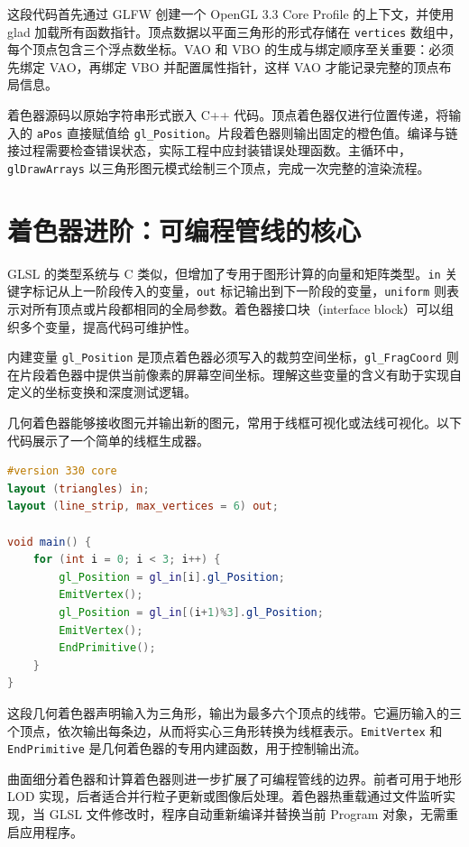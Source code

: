 这段代码首先通过 GLFW 创建一个 OpenGL 3.3 Core Profile 的上下文，并使用 glad 加载所有函数指针。顶点数据以平面三角形的形式存储在 \texttt{vertices} 数组中，每个顶点包含三个浮点数坐标。VAO 和 VBO 的生成与绑定顺序至关重要：必须先绑定 VAO，再绑定 VBO 并配置属性指针，这样 VAO 才能记录完整的顶点布局信息。\par
着色器源码以原始字符串形式嵌入 C++ 代码。顶点着色器仅进行位置传递，将输入的 \texttt{aPos} 直接赋值给 \texttt{gl\_{}Position}。片段着色器则输出固定的橙色值。编译与链接过程需要检查错误状态，实际工程中应封装错误处理函数。主循环中，\texttt{glDrawArrays} 以三角形图元模式绘制三个顶点，完成一次完整的渲染流程。\par
\chapter{着色器进阶：可编程管线的核心}
GLSL 的类型系统与 C 类似，但增加了专用于图形计算的向量和矩阵类型。\texttt{in} 关键字标记从上一阶段传入的变量，\texttt{out} 标记输出到下一阶段的变量，\texttt{uniform} 则表示对所有顶点或片段都相同的全局参数。着色器接口块（interface block）可以组织多个变量，提高代码可维护性。\par
内建变量 \texttt{gl\_{}Position} 是顶点着色器必须写入的裁剪空间坐标，\texttt{gl\_{}FragCoord} 则在片段着色器中提供当前像素的屏幕空间坐标。理解这些变量的含义有助于实现自定义的坐标变换和深度测试逻辑。\par
几何着色器能够接收图元并输出新的图元，常用于线框可视化或法线可视化。以下代码展示了一个简单的线框生成器。\par
\begin{lstlisting}[language=glsl]
#version 330 core
layout (triangles) in;
layout (line_strip, max_vertices = 6) out;

void main() {
    for (int i = 0; i < 3; i++) {
        gl_Position = gl_in[i].gl_Position;
        EmitVertex();
        gl_Position = gl_in[(i+1)%3].gl_Position;
        EmitVertex();
        EndPrimitive();
    }
}
\end{lstlisting}
这段几何着色器声明输入为三角形，输出为最多六个顶点的线带。它遍历输入的三个顶点，依次输出每条边，从而将实心三角形转换为线框表示。\texttt{EmitVertex} 和 \texttt{EndPrimitive} 是几何着色器的专用内建函数，用于控制输出流。\par
曲面细分着色器和计算着色器则进一步扩展了可编程管线的边界。前者可用于地形 LOD 实现，后者适合并行粒子更新或图像后处理。着色器热重载通过文件监听实现，当 GLSL 文件修改时，程序自动重新编译并替换当前 Program 对象，无需重启应用程序。\par
